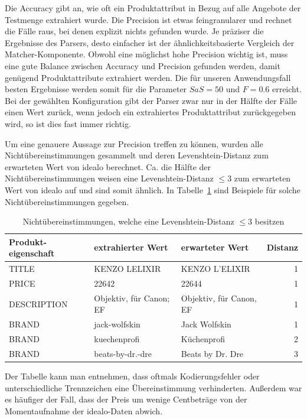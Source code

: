 Die Accuracy gibt an, wie oft ein Produktattribut in Bezug auf alle Angebote der Testmenge extrahiert wurde.
Die Precision ist etwas feingranularer und rechnet die Fälle raus, bei denen explizit nichts gefunden wurde.
Je präziser die Ergebnisse des Parsers, desto einfacher ist der ähnlichkeitsbasierte Vergleich der Matcher-Komponente.
Obwohl eine möglichst hohe Precision wichtig ist, muss eine gute Balance zwischen Accuracy und Precision gefunden
werden, damit genügend Produktattribute extrahiert werden.
Die für unseren Anwendungsfall besten Ergebnisse werden somit für die Parameter $SaS = 50$ und $F= 0.6$ erreicht.
Bei der gewählten Konfiguration gibt der Parser zwar nur in der Hälfte der Fälle einen Wert zurück, wenn jedoch ein
extrahiertes Produktattribut zurückgegeben wird, so ist dies fast immer richtig.

Um eine genauere Aussage zur Precision treffen zu können, wurden alle Nichtübereinstimmungen gesammelt und deren
Levenshtein-Distanz zum erwarteten Wert von idealo berechnet.
Ca. die Hälfte der Nichtübereinstimmungen weisen eine Levenshtein-Distanz $\leq 3$ zum erwarteten Wert von idealo
auf und sind somit ähnlich.
In Tabelle~\ref{tab:levenshtein-examples} sind Beispiele für solche Nichtübereinstimmungen gegeben.

\begin{table}[h]
    \centering
    \begin{tabular}{ p{2.75cm} | p{4.5cm} | p{4.5cm} | r}
        \textbf{Produkt-eigenschaft} & \textbf{extrahierter Wert} & \textbf{erwarteter Wert} &
        \textbf{Distanz} \\
        \hline
        TITLE & KENZO LELIXIR & KENZO L'ELIXIR & 1\\
        PRICE & 22642 & 22644 & 1\\
        DESCRIPTION & Objektiv, für Canon; EF	& Objektiv, für Canon, EF & 1\\
        BRAND & jack-wolfskin & Jack Wolfskin & 1\\
        BRAND &	kuechenprofi & Küchenprofi & 2\\
        BRAND & beats-by-dr.-dre & Beats by Dr. Dre & 3
    \end{tabular}
    \caption{Nichtübereinstimmungen, welche eine Levenshtein-Distanz $\leq 3$ besitzen}
    \label{tab:levenshtein-examples}
    \vspace{-0.25cm}
\end{table}

Der Tabelle kann man entnehmen, dass oftmals Kodierungsfehler oder unterschiedliche Trennzeichen eine
Übereinstimmung verhinderten.
Außerdem war es häufiger der Fall, dass der Preis um wenige Centbeträge von der Momentaufnahme der idealo-Daten
abwich.

